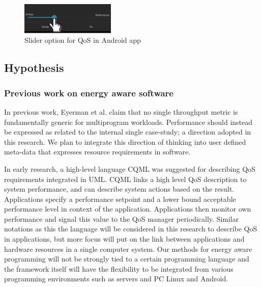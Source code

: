\documentclass{article}
\begin{document}
\begin{figure}
  \begin{center}
    \includegraphics[width=0.4\textwidth]{fig/slider.png}
  \end{center}
  \caption{Slider option for QoS in Android app}
  \label{fig:slider}
\end{figure}

\subsection{Hypothesis}

\subsubsection{Previous work on energy aware software}
In previous work, Eyerman et al. \cite{Eyerman:09} claim that no single throughput metric is fundamentally generic for multiprogram workloads. 
Performance should instead be expressed as related to the internal single case-study; a direction adopted in this research. 
We plan to integrate this direction of thinking into user defined meta-data that expresses resource requirements in software.

In early research, a high-level language CQML \cite{Aagedal:01} was suggested for describing QoS requirements integrated in UML. 
CQML links a high level QoS description to system performance, and can describe system actions based on the result. 
Applications specify a performance setpoint and a lower bound acceptable performance level in context of the application. 
Applications then monitor own performance and signal this value to the QoS manager periodically. 
Similar notations as this the language will be considered in this research to describe QoS in applications, 
but more focus will put on the link between applications and hardware resources in a single computer system.
Our methods for energy aware programming will not be strongly tied to a certain programming language and the framework itself will have the flexibility to be integrated from various programming environments such as servers and PC Linux and Android.
\end{document}
